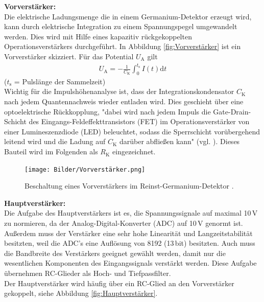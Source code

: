 \textbf{Vorverstärker:} \\
Die elektrische Ladungsmenge die in einem Germanium-Detektor erzeugt wird, kann durch elektrische Integration zu einem Spannungspegel umgewandelt werden. Dies wird mit Hilfe eines kapazitiv rückgekoppelten Operationsverstärkers durchgeführt. In Abbildung \eqref{fig:Vorverstärker} ist ein Vorverstärker skizziert. Für das Potential $U_\text{A}$ gilt
\begin{align}
  U_\text{A} = - \frac{1}{C_\text{K}} \int_{0}^{t_\text{s}} I(t) \text{d}t
\end{align}
\hfil {\footnotesize($t_\text{s}$ = Pulslänge der Sammelzeit)} \hfil \\
Wichtig für die Impulshöhenanalyse ist, dass der Integrationskondensator $C_\text{K}$ nach jedem Quantennachweis wieder entladen wird. Dies geschieht über eine optoelektrische Rückkopplung, "dabei wird nach jedem Impuls die Gate-Drain-Schicht des Eingangs-Feldeffekttransistors (FET) im Operationsverstärker von einer Lumineszenzdiode (LED) beleuchtet, sodass die Sperrschicht vorübergehend leitend wird und die Ladung auf $C_\text{K}$ darüber abfließen kann" (vgl. \cite[18]{V18}). Dieses Bauteil wird im Folgenden als $R_\text{K}$ eingezeichnet.

\begin{figure}[H]
  \centering
  \texttt{[image: Bilder/Vorverstärker.png]}
  \caption{Beschaltung eines Vorverstärkers im Reinst-Germanium-Detektor \cite{V18}.}
  \label{fig:Vorverstärker}
\end{figure}

\textbf{Hauptverstärker:} \\
Die Aufgabe des Hauptverstärkers ist es, die Spannungssignale auf maximal 10\,V zu normieren, da der Analog-Digital-Konverter (ADC) auf 10\,V genormt ist. Außerdem muss der Verstärker eine sehr hohe Linearität und Langzeitstabilität besitzten, weil die ADC's eine Auflösung von 8192 (13\,bit) besitzten. Auch muss die Bandbreite des Verstärkers geeignet gewählt werden, damit nur die wesentlichen Komponenten des Eingangssignals verstärkt werden. Diese Aufgabe übernehmen RC-Glieder als Hoch- und Tiefpassfilter. \\
Der Hauptverstärker wird häufig über ein RC-Glied an den Vorverstärker gekoppelt, siehe Abbildung \eqref{fig:Hauptverstärker}.

